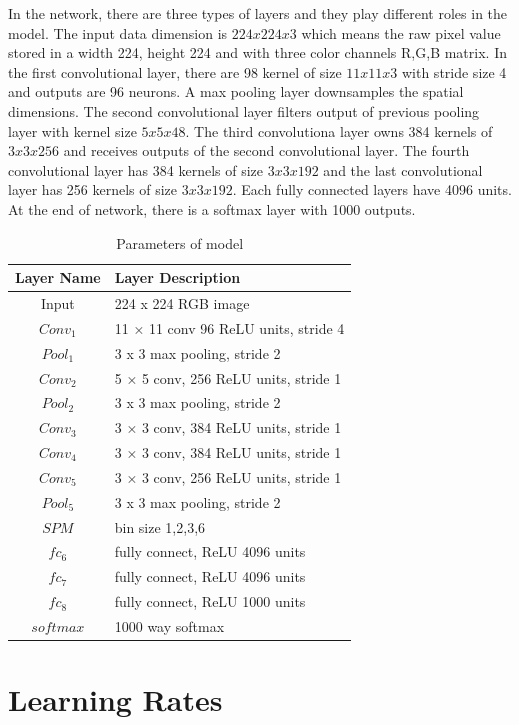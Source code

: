 In the network, there are three types of layers and they play different roles in the model. The input data dimension is $224x224x3$ which means the raw pixel value stored in a width 224, height 224 and with three color channels R,G,B matrix. In the first convolutional layer, there are 98 kernel of size $11x11x3$ with stride size 4 and outputs are 96 neurons. A max pooling layer downsamples the spatial dimensions. The second convolutional layer filters output of previous pooling layer with kernel size $5x5x48$. The third convolutiona layer owns 384 kernels of $3x3x256$ and receives outputs of the second convolutional layer. The fourth convolutional layer has 384 kernels of size $3x3x192$ and the last convolutional layer has 256 kernels of size $3x3x192$. Each fully connected layers have 4096 units. At the end of network, there is a softmax layer with 1000 outputs.
\begin{table}[h]
\begin{center}
    \begin{tabular}{ | c | p{8cm} | }
    \hline
    Layer Name & Layer Description \\ \hline
    Input & 224 x 224 RGB image \\ \hline
    $Conv_{1}$ & 11 × 11 conv 96 ReLU units, stride 4 \\ \hline
    $Pool_{1}$ & 3 x 3 max pooling, stride 2 \\ \hline
    $Conv_{2}$ & 5 × 5 conv, 256 ReLU units, stride 1 \\ \hline
    $Pool_{2}$ & 3 x 3 max pooling, stride 2 \\ \hline
    $Conv_{3}$ & 3 × 3 conv, 384 ReLU units, stride 1 \\ \hline
    $Conv_{4}$ & 3 × 3 conv, 384 ReLU units, stride 1 \\ \hline
    $Conv_{5}$ & 3 × 3 conv, 256 ReLU units, stride 1 \\ \hline
    $Pool_{5}$ & 3 x 3 max pooling, stride 2 \\ \hline
    $SPM$ & bin size 1,2,3,6 \\ \hline
    $fc_{6}$ & fully connect, ReLU 4096 units\\ \hline
    $fc_{7}$ & fully connect, ReLU 4096 units\\ \hline
    $fc_{8}$ & fully connect, ReLU 1000 units\\ \hline
    $softmax$ & 1000 way softmax\\ \hline
    \end{tabular}
    \caption{Parameters of model}
    \label{fig:parameters}
\end{center}
\end{table}


\section{Learning Rates}

















